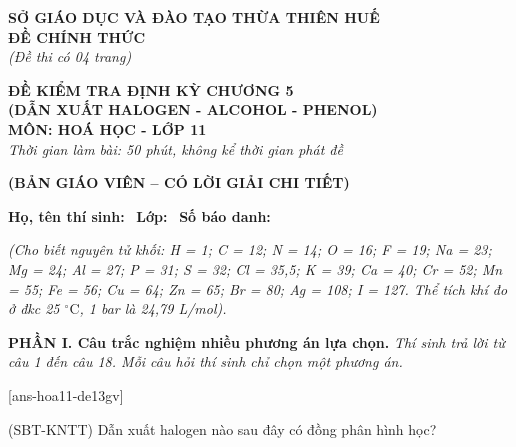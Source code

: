 \documentclass[12pt,a4paper]{article}
\begin{document}
\thispagestyle{firstpage}

\noindent
\begin{minipage}[t]{0.44\textwidth}
	\centering\fontsize{10pt}{12pt}\selectfont
	\textbf{SỞ GIÁO DỤC VÀ ĐÀO TẠO THỪA THIÊN HUẾ}\\
	\textbf{ĐỀ CHÍNH THỨC}\\
	\textit{(Đề thi có 04 trang)}
\end{minipage}\hfill
\begin{minipage}[t]{0.54\textwidth}
	\centering\fontsize{10.5pt}{13pt}\selectfont
	\textbf{ĐỀ KIỂM TRA ĐỊNH KỲ CHƯƠNG 5}\\
	\textbf{(DẪN XUẤT HALOGEN - ALCOHOL - PHENOL)}\\
	\textbf{MÔN: HOÁ HỌC - LỚP 11}\\
	\textit{Thời gian làm bài: 50 phút, không kể thời gian phát đề}
	
	\smallskip
\end{minipage}

\smallskip
\begin{center}
	{\color{hfRed}\textbf{\large (BẢN GIÁO VIÊN -- CÓ LỜI GIẢI CHI TIẾT)}}
\end{center}

\smallskip
\noindent\hrulefill
\smallskip

\noindent\textbf{Họ, tên thí sinh:} \dotfill\ \textbf{Lớp:} \dotfill\ \textbf{Số báo danh:} \dotfill

\smallskip
\noindent\textit{(Cho biết nguyên tử khối: H = 1; C = 12; N = 14; O = 16; F = 19; Na = 23; Mg = 24; Al = 27; P = 31; S = 32; Cl = 35,5; K = 39; Ca = 40; Cr = 52; Mn = 55; Fe = 56; Cu = 64; Zn = 65; Br = 80; Ag = 108; I = 127. Thể tích khí đo ở đkc 25 $^\circ\text{C}$, 1 bar là 24,79 L/mol).}
\smallskip

\noindent\textbf{\large PHẦN I. Câu trắc nghiệm nhiều phương án lựa chọn.}
\textit{Thí sinh trả lời từ câu 1 đến câu 18. Mỗi câu hỏi thí sinh chỉ chọn một phương án.}
\vspace{0.2cm}

[ans-hoa11-de13gv]

\begin{ex}
(SBT-KNTT) Dẫn xuất halogen nào sau đây có đồng phân hình học?
\choice
{}
{}
{\True {}}
{}
\end{ex}
\end{document}
